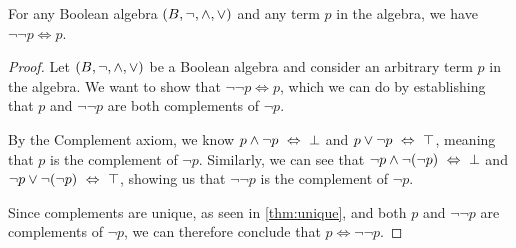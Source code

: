 \begin{theorem}
    For any Boolean algebra \((B, \neg, \wedge, \vee)\) and any term \(p\) in the algebra,
    we have \(\neg \neg p \iff p\).
\end{theorem}
\begin{proof}
    Let \((B, \neg, \wedge, \vee)\) be a Boolean algebra
    and consider an arbitrary term \(p\) in the algebra.
    We want to show that \(\neg \neg p \iff p\),
    which we can do by establishing that \(p\) and \(\neg \neg p\) are both complements of \(\neg p\).

    By the Complement axiom, we know \(p \wedge \neg p ~\Leftrightarrow~ \bot\) and \(p \vee \neg p ~\Leftrightarrow~ \top\),
    meaning that \(p\) is the complement of \(\neg p\).
    Similarly, we can see that
    \(\neg p \wedge \neg (\neg p) ~\Leftrightarrow~ \bot\) and \(\neg p \vee \neg (\neg p) ~\Leftrightarrow~ \top\),
    showing us that \(\neg \neg p\) is the complement of \(\neg p\).

    Since complements are unique, as seen in \autoref{thm:unique},
    and both \(p\) and \(\neg \neg p\) are complements of \(\neg p\),
    we can therefore conclude that \(p \iff \neg \neg p\).
\end{proof}


